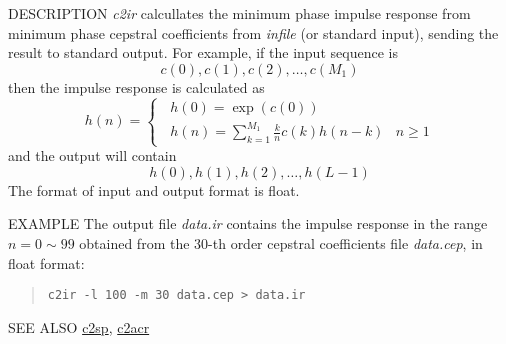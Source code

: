 \begin{synopsis}
 \item[c2ir] [ --l $L$ ] [ --m $M_1$ ] [ --M $M_2$ ] [ --i ] [ {\em infile} ]
\end{synopsis}

\begin{qsection}{DESCRIPTION}
{\em c2ir} calcullates the minimum phase impulse response 
from minimum phase cepstral coefficients 
from {\em infile} (or standard input), 
sending the result to standard output.
For example, if the input sequence is
\begin{displaymath}
   c(0),c(1),c(2),\dots,c(M_1)
\end{displaymath}
then the impulse response is calculated as
\begin{displaymath}
 h(n)= \begin{cases}
 \;\; h(0)=\exp(c(0)) & \\
 \;\; h(n)=\displaystyle \sum_{k=1}^{M_1} \frac{k}{n} c(k)h(n-k) & n \geq 1
 \end{cases}
\end{displaymath}
and the output will contain
\begin{displaymath}
   h(0),h(1),h(2),\dots,h(L -1)
\end{displaymath}
The format of input and output format is float.
\end{qsection}

\begin{options}
\end{options}

\begin{qsection}{EXAMPLE}
The output file {\em data.ir} contains the impulse response
in the range $n = 0 \sim 99$ obtained from the 30-th order cepstral
coefficients file {\em data.cep}, in float format:
 \begin{quote}
  \verb!c2ir -l 100 -m 30 data.cep > data.ir!
 \end{quote}
\end{qsection}

\begin{qsection}{SEE ALSO}
\hyperlink{c2sp}{c2sp},
\hyperlink{c2acr}{c2acr}
\end{qsection}
